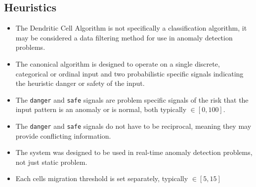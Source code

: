 \subsection{Heuristics}
\begin{itemize}
	\item The Dendritic Cell Algorithm is not specifically a classification algorithm, it may be considered a data filtering method for use in anomaly detection problems.
	\item The canonical algorithm is designed to operate on a single discrete, categorical or ordinal input and two probabilistic specific signals indicating the heuristic danger or safety of the input.
	\item The \texttt{danger} and \texttt{safe} signals are problem specific signals of the risk that the input pattern is an anomaly or is normal, both typically  $\in [0,100]$.
	\item The \texttt{danger} and \texttt{safe} signals do not have to be reciprocal, meaning they may provide conflicting information.
	\item The system was designed to be used in real-time anomaly detection problems, not just static problem.
	\item Each cells migration threshold is set separately, typically $\in [5,15]$
\end{itemize}

